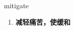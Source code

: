 
\begin{frame}
{\huge mitigate}
\begin{center}
\begin{enumerate}\Large
  \item \textbf{减轻痛苦，使缓和}
\end{enumerate}
\end{center}
\end{frame}
